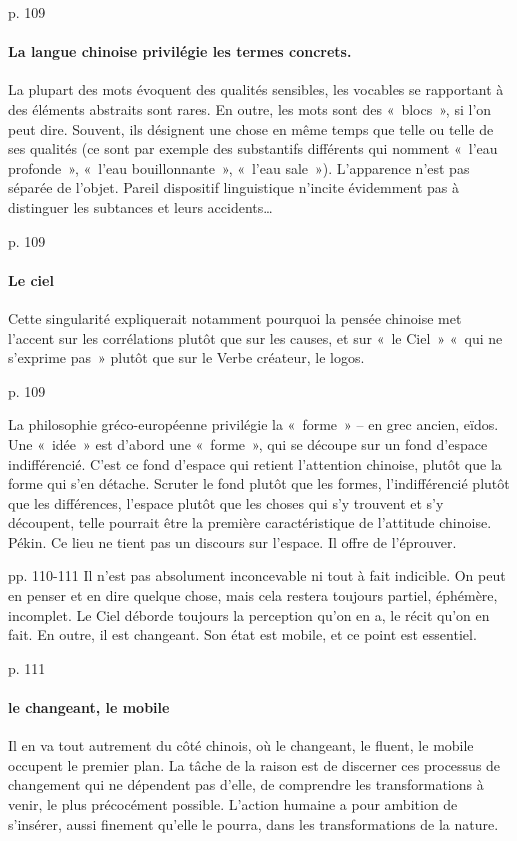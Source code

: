  

\cite{PolDroit:voyage} p. 109 

\paragraph{La langue chinoise privilégie les termes concrets. } La plupart des mots évoquent des qualités sensibles, les vocables se rapportant à des éléments abstraits sont rares. En outre, les mots sont des « blocs », si l’on peut dire. Souvent, ils désignent une chose en même temps que telle ou telle de ses qualités (ce sont par exemple des substantifs différents qui nomment « l’eau profonde », « l’eau bouillonnante », « l’eau sale »). L’apparence n’est pas séparée de l’objet. Pareil dispositif linguistique n’incite évidemment pas à distinguer les subtances et leurs accidents…
 

\cite{PolDroit:voyage} p. 109 


\paragraph{Le ciel} Cette singularité expliquerait notamment pourquoi la pensée chinoise met l’accent sur les corrélations plutôt que sur les causes, et sur « le Ciel » « qui ne s’exprime pas » plutôt que sur le Verbe créateur, le logos.

\cite{PolDroit:voyage} p. 109 

La philosophie gréco-européenne privilégie la « forme » – en grec ancien, eïdos. Une « idée » est d’abord une « forme », qui se découpe sur un fond d’espace indifférencié. C’est ce fond d’espace qui retient l’attention chinoise, plutôt que la forme qui s’en détache. Scruter le fond plutôt que les formes, l’indifférencié plutôt que les différences, l’espace plutôt que les choses qui s’y trouvent et s’y découpent, telle pourrait être la première caractéristique de l’attitude chinoise.
Pékin. Ce lieu ne tient pas un discours sur l’espace. Il offre de l’éprouver.

\cite{PolDroit:voyage} pp. 110-111 
Il n’est pas absolument inconcevable ni tout à fait indicible. On peut en penser
et en dire quelque chose, mais cela restera toujours partiel, éphémère, incomplet. Le Ciel déborde toujours la perception qu’on en a, le récit qu’on en fait. En outre, il est changeant. Son état est mobile, et ce point est essentiel.

\cite{PolDroit:voyage} p. 111 

\paragraph{le changeant, le mobile} Il en va tout autrement du côté chinois, où le changeant, le fluent, le mobile occupent le premier plan. La tâche de la raison est de discerner ces processus de changement qui ne dépendent pas d’elle, de comprendre les transformations à venir, le plus précocément possible. L’action humaine a pour ambition de s’insérer, aussi finement qu’elle le pourra, dans les transformations de la nature.

